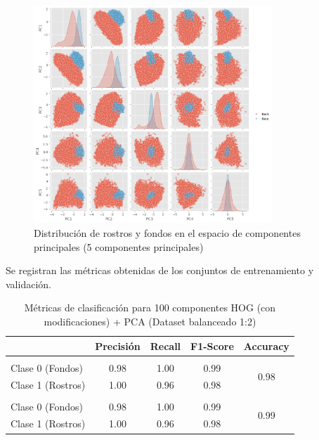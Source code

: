 \documentclass{article}
\begin{document}
\begin{figure}[H]
    \centering
    \includegraphics[width=0.8\textwidth]{tarea_4/imagenes/pairplot_cambios_hog_x2_v1_20.png}
    \caption{Distribución de rostros y fondos en el espacio de componentes principales (5 componentes principales)}
    \label{fig:pca_classes}
\end{figure}

Se registran las métricas obtenidas de los conjuntos de entrenamiento y validación.

\begin{table}[H]
    \centering
    \begin{tabular}{|>{\centering\arraybackslash}m{3.2cm}|c|c|c|c|}
    \hline
    \rowcolor{tableblue} \multicolumn{1}{|c|}{\textbf{Conjunto}} & \textbf{Precisión} & \textbf{Recall} & \textbf{F1-Score} & \textbf{Accuracy} \\
    \hline
    \multicolumn{5}{|c|}{\textbf{Entrenamiento}} \\
    \hline
    Clase 0 (Fondos) & 0.98 & 1.00 & 0.99 & \multirow{2}{*}{0.98} \\
    Clase 1 (Rostros) & 1.00 & 0.96 & 0.98 & \\
    \hline
    \multicolumn{5}{|c|}{\textbf{Validación}} \\
    \hline
    Clase 0 (Fondos) & 0.98 & 1.00 & 0.99 & \multirow{2}{*}{0.99} \\
    Clase 1 (Rostros) & 1.00 & 0.96 & 0.98 & \\
    \hline
    \end{tabular}
    \caption{Métricas de clasificación para 100 componentes HOG (con modificaciones) + PCA (Dataset balanceado 1:2)}
    \label{tab:hog_pca_x1_metrics}
\end{table}
\end{document}
